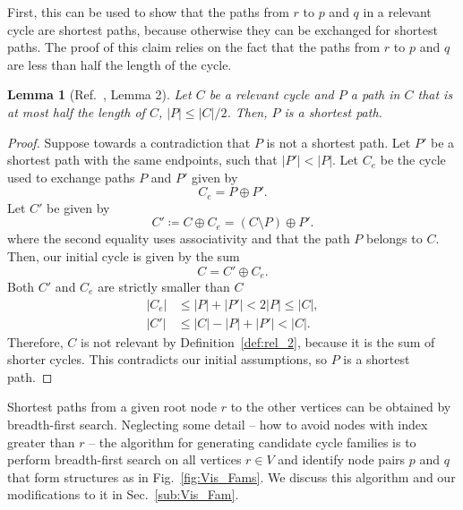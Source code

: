 \documentclass[fleqn,11pt]{article}
\newtheorem{lemma}[theorem]{Lemma}
\begin{document}
First, this can be used to show that the paths from $r$ to $p$ and $q$ in a relevant cycle are shortest paths, because otherwise they can be exchanged for shortest paths. The proof of this claim relies on the fact that the paths from $r$ to $p$ and $q$ are less than half the length of the cycle. 



\begin{lemma}[Ref.~\cite{vismaraUnion1997}, Lemma 2] %
	Let $C$ be a relevant cycle and $P$ a path in $C$ that is at most half the length of $C$, $|P|\le|C|/2$. Then, $P$ is a shortest path.
	\label{lem:shortest_paths}
\end{lemma}

\begin{proof}
	Suppose towards a contradiction that $P$ is not a shortest path. Let $P'$ be a shortest path with the same endpoints, such that $|P'|<|P|$. Let $C_e$ be the cycle used to exchange paths $P$ and $P'$ given by
	\begin{equation}
		C_e = P\oplus P'.
	\end{equation}
	Let $C'$ be given by
	\begin{equation}
		C' \coloneq C\oplus C_e = (C\setminus P)\oplus P'.
	\end{equation}
	where the second equality uses associativity and that the path $P$ belongs to $C$. Then, our initial cycle is given by the sum
	\begin{equation}
		C = C'\oplus C_e.
	\end{equation}
	Both $C'$ and $C_e$ are strictly smaller than $C$
	\begin{align}
		|C_e| &\le |P|+|P'|< 2|P|\le |C|,\\
		|C'| &\le |C| - |P| + |P'| < |C|.
	\end{align}
	Therefore, $C$ is not relevant by Definition~\ref{def:rel_2}, because it is the sum of shorter cycles. This contradicts our initial assumptions, so $P$ is a shortest path.
\end{proof}



Shortest paths from a given root node $r$ to the other vertices can be obtained by breadth-first search. 
Neglecting some detail -- how to avoid nodes with index greater than $r$ -- the algorithm for generating candidate cycle families is to perform breadth-first search on all vertices $r\in V$ and identify node pairs $p$ and $q$ that form structures as in Fig.~\ref{fig:Vis_Fams}. 
We discuss this algorithm and our modifications to it in Sec.~\ref{sub:Vis_Fam}.
\end{document}
